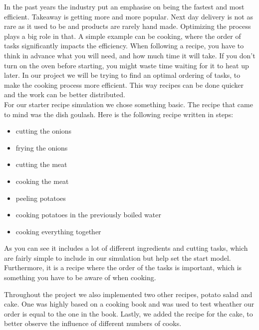 
In the past years the industry put an emphasise on being the fastest and most efficient. Takeaway is getting more and more popular. Next day delivery is not as rare as it used to be and products are rarely hand made. 
Optimizing the process plays a big role in that. A simple example can be cooking, where the order of tasks significantly impacts the efficiency. When following a recipe, you have to think in advance what you will need, and how much time it will take. If you don't turn on the oven before starting, you might waste time waiting for it to heat up later. In our project we will be trying to find an optimal ordering of tasks, to make the cooking process more efficient. This way recipes can be done quicker and the work can be better distributed. \\

For our starter recipe simulation we chose something basic. The recipe that came to mind was the dish goulash. Here is the following recipe written in steps:
\begin{itemize}
    \item cutting the onions
    \item frying the onions
    \item cutting the meat 
    \item cooking the meat 
    \item peeling potatoes
    \item cooking potatoes in the previously boiled water
    \item cooking everything together
\end{itemize}

As you can see it includes a lot of different ingredients and cutting tasks, which are fairly simple to include in our simulation but help set the start model. 
Furthermore, it is a recipe where the order of the tasks is important, which is something you have to be aware of when cooking. 

Throughout the project we also implemented two other recipes, potato salad and cake. One was highly based on a cooking book and was 
used to test wheather our order is equal to the one in the book. Lastly, we added the recipe for the cake, to better observe the 
influence of different numbers of cooks.
